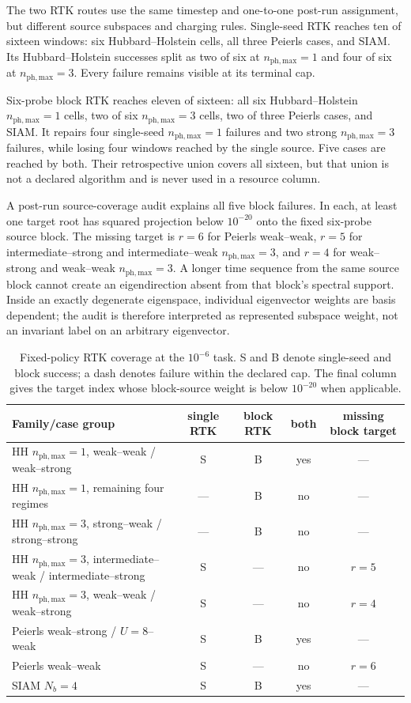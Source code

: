 \documentclass[
  reprint,
  amsmath,
  amssymb,
  aps,
  pra,
  nofootinbib,
  superscriptaddress,
  floatfix
]{revtex4-2}
\newcommand{\phmax}{n_{\mathrm{ph,max}}}
\begin{document}
The two RTK routes use the same timestep and one-to-one post-run assignment,
but different source subspaces and charging rules.  Single-seed RTK reaches
ten of sixteen windows: six Hubbard--Holstein cells, all three Peierls cases,
and SIAM.  Its Hubbard--Holstein successes split as two of six at $\phmax=1$
and four of six at $\phmax=3$.  Every failure remains visible at its terminal
cap.

Six-probe block RTK reaches eleven of sixteen: all six Hubbard--Holstein
$\phmax=1$ cells, two of six $\phmax=3$ cells, two of three Peierls cases,
and SIAM.  It repairs four single-seed $\phmax=1$ failures and two strong
$\phmax=3$ failures, while losing four windows reached by the single source.
Five cases are reached by both.  Their retrospective union covers all
sixteen, but that union is not a declared algorithm and is never used in a
resource column.

A post-run source-coverage audit explains all five block failures.  In each,
at least one target root has squared projection below $10^{-20}$ onto the
fixed six-probe source block.  The missing target is $r=6$ for Peierls
weak--weak, $r=5$ for intermediate--strong and intermediate--weak
$\phmax=3$, and $r=4$ for weak--strong and weak--weak $\phmax=3$.  A longer
time sequence from the same source block cannot create an eigendirection
absent from that block's spectral support.  Inside an exactly degenerate
eigenspace, individual eigenvector weights are basis dependent; the audit is
therefore interpreted as represented subspace weight, not an invariant label
on an arbitrary eigenvector.

\begin{table}[t]
\caption{Fixed-policy RTK coverage at the
$10^{-6}$ task.  S and B denote single-seed and block success; a dash denotes
failure within the declared cap.  The final column gives the target index
whose block-source weight is below $10^{-20}$ when applicable.}
\label{tab:krylov_coverage}
\begin{center}
\small
\begin{tabular*}{\textwidth}{@{\extracolsep{\fill}}lcccc@{}}
\toprule
Family/case group & single RTK & block RTK & both & missing block target \\
\midrule
HH $\phmax=1$, weak--weak / weak--strong & S & B & yes & --- \\
HH $\phmax=1$, remaining four regimes & --- & B & no & --- \\
HH $\phmax=3$, strong--weak / strong--strong & --- & B & no & --- \\
HH $\phmax=3$, intermediate--weak / intermediate--strong & S & --- & no & $r=5$ \\
HH $\phmax=3$, weak--weak / weak--strong & S & --- & no & $r=4$ \\
Peierls weak--strong / $U=8$--weak & S & B & yes & --- \\
Peierls weak--weak & S & --- & no & $r=6$ \\
SIAM $N_b=4$ & S & B & yes & --- \\
\bottomrule
\end{tabular*}
\end{center}
\end{table}
\end{document}
